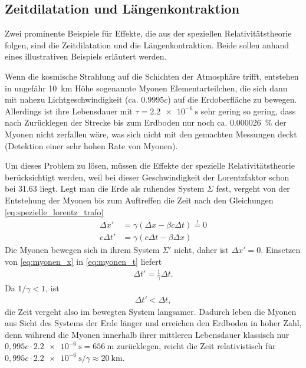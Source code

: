 \subsection{Zeitdilatation und Längenkontraktion}

Zwei prominente Beispiele für Effekte, die aus der speziellen Relativitätstheorie folgen, sind die Zeitdilatation und die Längenkontraktion.
Beide sollen anhand eines illustrativen Beispiels erläutert werden.

Wenn die kosmische Strahlung auf die Schichten der Atmosphäre trifft, entstehen in ungefähr \SI{10}{\km} Höhe sogenannte Myonen \textendash{} Elementarteilchen, die sich dann mit nahezu Lichtgeschwindigkeit (ca. $\num{0,9995}c$) auf die Erdoberfläche zu bewegen.
Allerdings ist ihre Lebensdauer mit $\tau=\SI{2,2e-6}{\s}$ sehr gering \textendash{} so gering, dass nach Zurücklegen der Strecke bis zum Erdboden nur noch ca. \SI{0,000026}{\percent} der Myonen nicht zerfallen wäre, was sich nicht mit den gemachten Messungen deckt (Detektion einer sehr hohen Rate von Myonen).

Um dieses Problem zu lösen, müssen die Effekte der spezielle Relativitätstheorie berücksichtigt werden, weil bei dieser Geschwindigkeit der Lorentzfaktor schon bei \num{31,63} liegt.
Legt man die Erde als ruhendes System $\Sigma$ fest, vergeht von der Entstehung der Myonen bis zum Auftreffen die Zeit nach den Gleichungen \eqref{eq:spezielle_lorentz_trafo}
\begin{align}
    \label{eq:myonen_x}
    \Delta x'  & = \gamma(\Delta x-\beta c\Delta t) \overset{!}{=} 0 \\
    \label{eq:myonen_t}
    c\Delta t' & = \gamma(c \Delta t-\beta \Delta x)
\end{align}
Die Myonen bewegen sich in ihrem System $\Sigma'$ nicht, daher ist $\Delta x'= 0$.
Einsetzen von \eqref{eq:myonen_x} in \eqref{eq:myonen_t} liefert
\begin{align}
    \label{eq:zeitdilatation}
    \Delta t' = \frac{1}{\gamma}\Delta t.
\end{align}
Da $1/\gamma < 1$, ist
\begin{align*}
    \Delta t' < \Delta t,
\end{align*}
die Zeit vergeht also im bewegten System langsamer. 
Dadurch leben die Myonen aus Sicht des Systems der Erde länger und erreichen den Erdboden in hoher Zahl,
denn während die Myonen innerhalb ihrer mittleren Lebensdauer klassisch nur $0,995c\cdot\SI{2,2e-6}{\s}=\SI{656}{\m}$ zurücklegen,
reicht die Zeit relativistisch für $0,995c\cdot\SI{2,2e-6}{\s}/\gamma\approx\SI{20}{\km}$.



